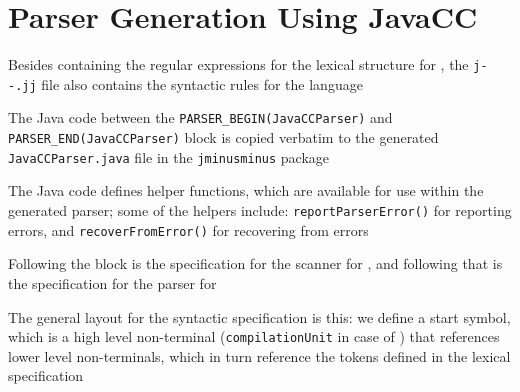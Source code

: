 \documentclass[8pt,a4paper,compress,handout]{beamer}
\begin{document}
\section{Parser Generation Using JavaCC}
\begin{frame}[fragile]
\pause

Besides containing the regular expressions for the lexical structure for \jmm, the \lstinline{j--.jj} file also contains the syntactic rules for the language

\pause
\bigskip

The Java code between the \lstinline{PARSER_BEGIN(JavaCCParser)} and \lstinline{PARSER_END(JavaCCParser)} block is copied verbatim to the generated \lstinline{JavaCCParser.java} file in the \lstinline{jminusminus} package

\pause
\bigskip

The Java code defines helper functions, which are available for use within the generated parser; some of the helpers include: \lstinline{reportParserError()} for reporting errors, and \lstinline{recoverFromError()} for recovering from errors

\pause
\bigskip

Following the block is the specification for the scanner for \jmm, and following that is the specification for the parser for \jmm

\pause
\bigskip

The general layout for the syntactic specification is this: we define a start symbol, which is a high level non-terminal (\lstinline{compilationUnit} in case of \jmm) that references lower level non-terminals, which in turn reference the tokens defined in the lexical specification
\end{frame}
\end{document}
